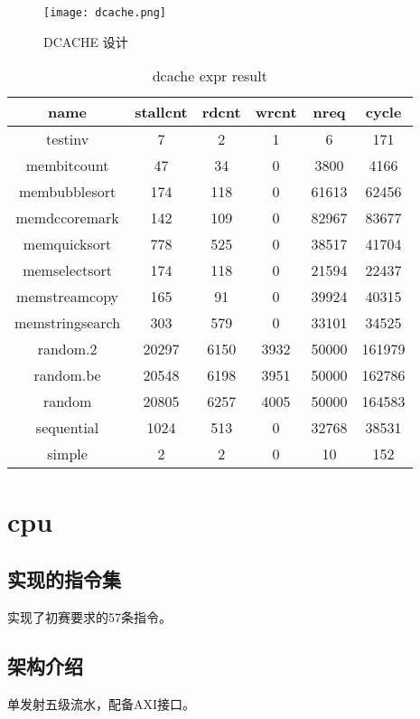 \documentclass[lang=cn,11pt]{elegantpaper}
\begin{document}
\begin{figure}[htbp]
	\centering
	\texttt{[image: dcache.png]}
	\caption{DCACHE 设计}
	\label{dcache}
\end{figure}
\begin{table}[h]
	\center
	\caption{dcache expr result}
	\label{dexpr}
	\begin{tabular}{|c|c|c|c|c|c|}
		\hline
		name & stall\underline{\hspace{0.5em}}cnt & rd\underline{\hspace{0.5em}}cnt & wr\underline{\hspace{0.5em}}cnt & n\underline{\hspace{0.5em}}req & cycle \\ \hline
		test\underline{\hspace{0.5em}}inv & 7 & 2 & 1 & 6 & 171 \\ \hline
		mem\underline{\hspace{0.5em}}bitcount & 47 & 34 & 0 & 3800 & 4166 \\ \hline
		mem\underline{\hspace{0.5em}}bubble\underline{\hspace{0.5em}}sort & 174 & 118 & 0 & 61613 & 62456 \\ \hline
		mem\underline{\hspace{0.5em}}dc\underline{\hspace{0.5em}}coremark & 142 & 109 & 0 & 82967 & 83677 \\ \hline
		mem\underline{\hspace{0.5em}}quick\underline{\hspace{0.5em}}sort & 778 & 525 & 0 & 38517 & 41704 \\ \hline
		mem\underline{\hspace{0.5em}}select\underline{\hspace{0.5em}}sort & 174 & 118 & 0 & 21594 & 22437 \\ \hline
		mem\underline{\hspace{0.5em}}stream\underline{\hspace{0.5em}}copy & 165 & 91 & 0 & 39924 & 40315 \\ \hline
		mem\underline{\hspace{0.5em}}string\underline{\hspace{0.5em}}search & 303 & 579 & 0 & 33101 & 34525 \\ \hline
		random.2 & 20297 & 6150 & 3932 & 50000 & 161979 \\ \hline
		random.be & 20548 & 6198 & 3951 & 50000 & 162786 \\ \hline
		random & 20805 & 6257 & 4005 & 50000 & 164583 \\ \hline
		sequential & 1024 & 513 & 0 & 32768 & 38531 \\ \hline
		simple & 2 & 2 & 0 & 10 & 152 \\ \hline
	\end{tabular}
\end{table}

\section{cpu}
\subsection{实现的指令集}
实现了初赛要求的57条指令。
\subsection{架构介绍}
单发射五级流水，配备AXI接口。
\end{document}
